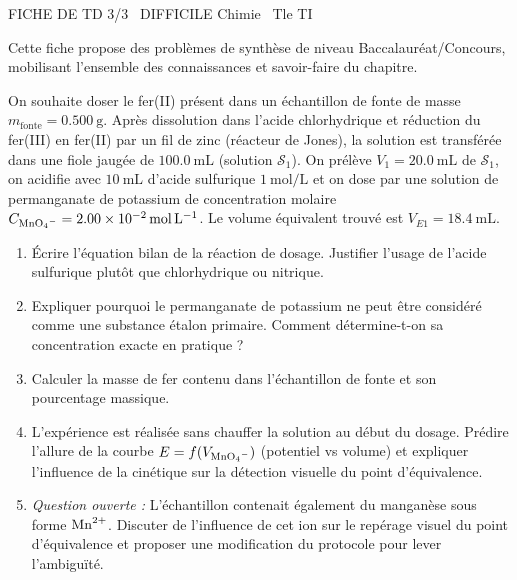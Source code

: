 \documentclass[11pt]{article}
\begin{document}
\begin{tcolorbox}[enhanced,colback=popink,colframe=popink,arc=10pt,boxrule=0pt,left=12pt,right=12pt,top=9pt,bottom=9pt]
{\color{white}\popxbold\small FICHE DE TD 3/3 \textbullet\ DIFFICILE \hfill Chimie \textbullet\ Tle TI\par}
\end{tcolorbox}
\vspace{4pt}
Cette fiche propose des problèmes de synthèse de niveau Baccalauréat/Concours, mobilisant l'ensemble des connaissances et savoir-faire du chapitre.

\begin{exercice}
On souhaite doser le fer(II) présent dans un échantillon de fonte de masse $m_{\text{fonte}} = \SI{0,500}{\gram}$. Après dissolution dans l'acide chlorhydrique et réduction du fer(III) en fer(II) par un fil de zinc (réacteur de Jones), la solution est transférée dans une fiole jaugée de $\SI{100,0}{\mL}$ (solution $\mathcal{S}_1$). On prélève $V_1 = \SI{20,0}{\mL}$ de $\mathcal{S}_1$, on acidifie avec $\SI{10}{\mL}$ d'acide sulfurique $\SI{1}{\mol\per\L}$ et on dose par une solution de permanganate de potassium de concentration molaire $C_{\ce{MnO4-}} = \SI{2,00e-2}{\mol\per\L}$. Le volume équivalent trouvé est $V_{E1} = \SI{18,4}{\mL}$.
\begin{enumerate}
    \item Écrire l'équation bilan de la réaction de dosage. Justifier l'usage de l'acide sulfurique plutôt que chlorhydrique ou nitrique.
    \item Expliquer pourquoi le permanganate de potassium ne peut être considéré comme une substance étalon primaire. Comment détermine-t-on sa concentration exacte en pratique ?
    \item Calculer la masse de fer contenu dans l'échantillon de fonte et son pourcentage massique.
    \item L'expérience est réalisée sans chauffer la solution au début du dosage. Prédire l'allure de la courbe $E = f(V_{\ce{MnO4-}})$ (potentiel vs volume) et expliquer l'influence de la cinétique sur la détection visuelle du point d'équivalence.
    \item \textit{Question ouverte :} L'échantillon contenait également du manganèse sous forme $\ce{Mn^{2+}}$. Discuter de l'influence de cet ion sur le repérage visuel du point d'équivalence et proposer une modification du protocole pour lever l'ambiguïté.
\end{enumerate}
\end{exercice}
\end{document}
